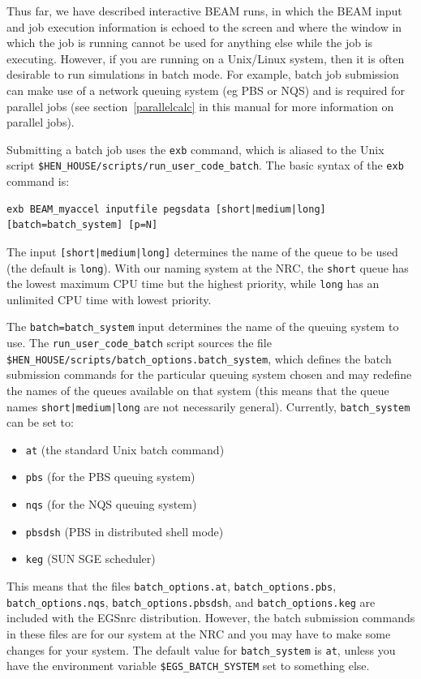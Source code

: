 \documentclass[12pt,twoside]{article}
\begin{document}
Thus far, we have described interactive BEAM runs, in which the BEAM
input and job execution information is echoed to the screen and where
the window in which the job is running cannot be used for anything else
while the job is executing.  However, if you are running on a Unix/Linux
system, then it is often desirable to run simulations in batch mode.
For example, batch
job submission can make use of a network queuing system
(eg PBS or NQS) and is required for parallel jobs
(see section~\ref{parallelcalc} in this manual for more information
on parallel jobs).

Submitting a batch job uses the {\tt exb} command, which is aliased
to the Unix script {\tt \$HEN\_HOUSE/scripts/run\_user\_code\_batch}.  The
basic syntax of the {\tt exb} command is:
\begin{verbatim}
exb BEAM_myaccel inputfile pegsdata [short|medium|long] [batch=batch_system] [p=N]
\end{verbatim}

The input {\tt [short|medium|long]} determines the name of the queue to be used
(the default is {\tt long}).  With our naming system at the NRC,
the {\tt short} queue
has the lowest maximum CPU time but the highest priority, while {\tt long} has
an unlimited CPU time with lowest priority.

The {\tt batch=batch\_system} input
determines the name of the queuing system to use.  The
{\tt run\_user\_code\_batch} script sources the file
{\tt \$HEN\_HOUSE/scripts/batch\_options.batch\_system}, which defines
the batch submission commands for the particular queuing system chosen
and may redefine the names of the queues available on that system
(this means that the queue names {\tt short|medium|long} are not
necessarily general).  Currently, {\tt batch\_system} can be set to:
\begin{itemize}
\item {\tt at} (the standard Unix batch command)
\item {\tt pbs} (for the
PBS queuing system)
\item {\tt nqs} (for the NQS queuing system)
\item {\tt pbsdsh} (PBS in distributed shell mode)
\item {\tt keg} (SUN SGE scheduler)
\end{itemize}
This means that the files
{\tt batch\_options.at}, {\tt batch\_options.pbs},
{\tt batch\_options.nqs}, {\tt batch\_options.pbsdsh}, and
{\tt batch\_options.keg} are included with the EGSnrc distribution.  However,
the batch submission commands in these files are for our system at the NRC
and you may have to make some changes for your system.  The default
value for {\tt batch\_system} is {\tt at}, unless you have the environment
variable {\tt \$EGS\_BATCH\_SYSTEM} set to something else.
\end{document}
